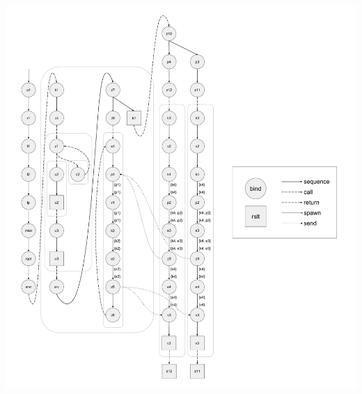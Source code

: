\documentclass[10pt]{article}
\begin{document}
\includegraphics[width=1\textwidth]{cml-liveness-analysis-k4.pdf}
\end{document}
